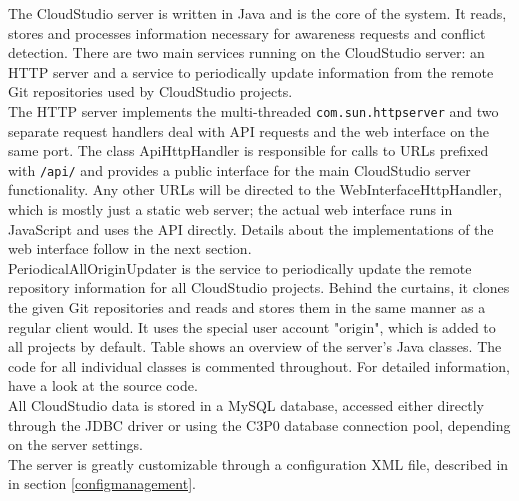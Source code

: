 The CloudStudio server is written in Java and is the core of the system. It reads, stores and processes information necessary for awareness requests and conflict detection. There are two main services running on the CloudStudio server: an HTTP server and a service to periodically update information from the remote Git repositories used by CloudStudio projects. \\

The HTTP server implements the multi-threaded \texttt{com.sun.httpserver} and two separate request handlers deal with API requests and the web interface on the same port. The class ApiHttpHandler is responsible for calls to URLs prefixed with \texttt{/api/} and provides a public interface for the main CloudStudio server functionality. Any other URLs will be directed to the WebInterfaceHttpHandler, which is mostly just a static web server; the actual web interface runs in JavaScript and uses the API directly. Details about the implementations of the web interface follow in the next section. \\

PeriodicalAllOriginUpdater is the service to periodically update the remote repository information for all CloudStudio projects. Behind the curtains, it clones the given Git repositories and reads and stores them in the same manner as a regular client would. It uses the special user account "origin", which is added to all projects by default. Table \cite{fig:serverclasses} shows an overview of the server's Java classes. The code for all individual classes is commented throughout. For detailed information, have a look at the source code. \\

All CloudStudio data is stored in a MySQL database, accessed either directly through the JDBC driver or using the C3P0 database connection pool, depending on the server settings. \\

The server is greatly customizable through a configuration XML file, described in in section \ref{configmanagement}.


